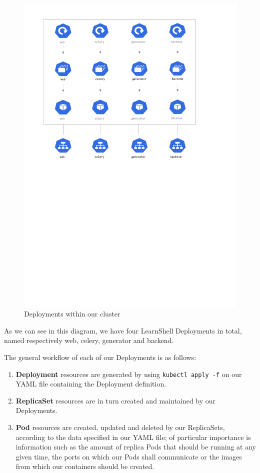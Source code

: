 \documentclass[thesis=B,english]{FITthesis}[2019/12/23]
\begin{document}
\begin{figure}[H]
\centering
\caption{Deployments within our cluster}
\hspace*{-2cm}
\includegraphics[scale=0.5]{deployment-diagram}
\end{figure}

As we can see in this diagram, we have four LearnShell Deployments in total, named respectively web, celery, generator and backend.

The general workflow of each of our Deployments is as follows:

\begin{enumerate}
  \setlength\itemsep{0em}
  \item \textbf{Deployment} resources are generated by using \verb|kubectl apply -f| on our YAML file containing the Deployment definition.
  \item \textbf{ReplicaSet} resources are in turn created and maintained by our Deployments.
  \item \textbf{Pod} resources are created, updated and deleted by our ReplicaSets, according to the data specified in our YAML file; of particular importance is information such as the amount of replica Pods that should be running at any given time, the ports on which our Pods shall communicate or the images from which our containers should be created.
\end{enumerate}
\end{document}
